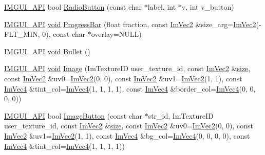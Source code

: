 \begin{DoxyCompactItemize}
\item 
\hyperlink{imgui_8h_a43829975e84e45d1149597467a14bbf5}{I\+M\+G\+U\+I\+\_\+\+A\+PI} bool \hyperlink{namespaceImGui_a018d2b61d2f00bb7a9dd2b1f933b93a5}{Radio\+Button} (const char $\ast$label, int $\ast$v, int v\+\_\+button)
\item 
\hyperlink{imgui_8h_a43829975e84e45d1149597467a14bbf5}{I\+M\+G\+U\+I\+\_\+\+A\+PI} \hyperlink{imgui__impl__opengl3__loader_8h_ac668e7cffd9e2e9cfee428b9b2f34fa7}{void} \hyperlink{namespaceImGui_a412b0416ad68c0ac46e5d66805d911ff}{Progress\+Bar} (float fraction, const \hyperlink{structImVec2}{Im\+Vec2} \&size\+\_\+arg=\hyperlink{structImVec2}{Im\+Vec2}(-\/F\+L\+T\+\_\+\+M\+IN, 0), const char $\ast$overlay=N\+U\+LL)
\item 
\hyperlink{imgui_8h_a43829975e84e45d1149597467a14bbf5}{I\+M\+G\+U\+I\+\_\+\+A\+PI} \hyperlink{imgui__impl__opengl3__loader_8h_ac668e7cffd9e2e9cfee428b9b2f34fa7}{void} \hyperlink{namespaceImGui_ae2d22212681556d2c2398dfd152f3121}{Bullet} ()
\item 
\hyperlink{imgui_8h_a43829975e84e45d1149597467a14bbf5}{I\+M\+G\+U\+I\+\_\+\+A\+PI} \hyperlink{imgui__impl__opengl3__loader_8h_ac668e7cffd9e2e9cfee428b9b2f34fa7}{void} \hyperlink{namespaceImGui_ad8705ac3b718c1b2e84e7b8c34f90249}{Image} (Im\+Texture\+ID user\+\_\+texture\+\_\+id, const \hyperlink{structImVec2}{Im\+Vec2} \&\hyperlink{imgui__impl__opengl3__loader_8h_a3d1e3edfcf61ca2d831883e1afbad89e}{size}, const \hyperlink{structImVec2}{Im\+Vec2} \&uv0=\hyperlink{structImVec2}{Im\+Vec2}(0, 0), const \hyperlink{structImVec2}{Im\+Vec2} \&uv1=\hyperlink{structImVec2}{Im\+Vec2}(1, 1), const \hyperlink{structImVec4}{Im\+Vec4} \&tint\+\_\+col=\hyperlink{structImVec4}{Im\+Vec4}(1, 1, 1, 1), const \hyperlink{structImVec4}{Im\+Vec4} \&border\+\_\+col=\hyperlink{structImVec4}{Im\+Vec4}(0, 0, 0, 0))
\item 
\hyperlink{imgui_8h_a43829975e84e45d1149597467a14bbf5}{I\+M\+G\+U\+I\+\_\+\+A\+PI} bool \hyperlink{namespaceImGui_a33dfbecf9f016b0fc9b317f99f123f9b}{Image\+Button} (const char $\ast$str\+\_\+id, Im\+Texture\+ID user\+\_\+texture\+\_\+id, const \hyperlink{structImVec2}{Im\+Vec2} \&\hyperlink{imgui__impl__opengl3__loader_8h_a3d1e3edfcf61ca2d831883e1afbad89e}{size}, const \hyperlink{structImVec2}{Im\+Vec2} \&uv0=\hyperlink{structImVec2}{Im\+Vec2}(0, 0), const \hyperlink{structImVec2}{Im\+Vec2} \&uv1=\hyperlink{structImVec2}{Im\+Vec2}(1, 1), const \hyperlink{structImVec4}{Im\+Vec4} \&bg\+\_\+col=\hyperlink{structImVec4}{Im\+Vec4}(0, 0, 0, 0), const \hyperlink{structImVec4}{Im\+Vec4} \&tint\+\_\+col=\hyperlink{structImVec4}{Im\+Vec4}(1, 1, 1, 1))

\end{DoxyCompactItemize}
